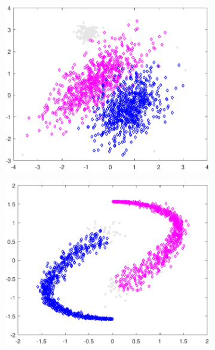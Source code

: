\documentclass[preprint,12pt]{elsarticle}
\begin{document}
\begin{figure}[!htb]
		\begin{subfigure}[b]{0.40\linewidth}
			\centering\includegraphics[width=1\linewidth]{figures/normdatamodel_kc.pdf}
			\caption{\label{fig:kcstepc1}}
		\end{subfigure}
		\begin{subfigure}[b]{0.40\linewidth}
			\centering\includegraphics[width=1\linewidth]{figures/yydatamodel_kc.pdf}
			\caption{\label{fig:kcstepc2}}
		\end{subfigure}
		\caption{
}
\end{figure}
\end{document}

